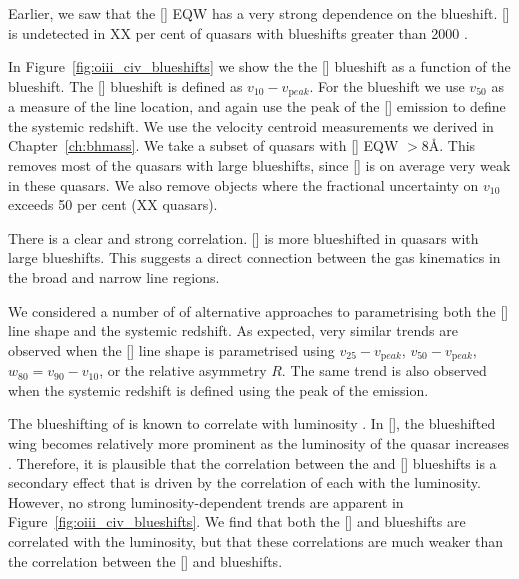 Earlier, we saw that the [] EQW has a very strong dependence on the  blueshift. 
[] is undetected in XX per cent of quasars with  blueshifts greater than 2000 \kms. 

In Figure~\ref{fig:oiii_civ_blueshifts} we show the the [] blueshift as a function of the  blueshift.
The [] blueshift is defined as $v_{10} - v_{\mathrm peak}$.
For the  blueshift we use $v_{50}$ as a measure of the line location, and again use the peak of the [] emission to define the systemic redshift. 
We use the  velocity centroid measurements we derived in Chapter~\ref{ch:bhmass}.
We take a subset of quasars with [] EQW $>8$\AA. 
This removes most of the quasars with large  blueshifts, since [] is on average very weak in these quasars. 
We also remove objects where the fractional uncertainty on $v_{10}$ exceeds 50 per cent (XX quasars). 

There is a clear and strong correlation.
[] is more blueshifted in quasars with large  blueshifts. 
This suggests a direct connection between the gas kinematics in the broad and narrow line regions. 

We considered a number of of alternative approaches to parametrising both the [] line shape and the systemic redshift. 
As expected, very similar trends are observed when the [] line shape is parametrised using $v_{25} - v_{\mathrm peak}$, $v_{50} - v_{\mathrm peak}$, $w_{80} = v_{90} - v_{10}$, or the relative asymmetry $R$.
The same trend is also observed when the systemic redshift is defined using the peak of the \hb emission. 

The blueshifting of  is known to correlate with luminosity \citep{richards11}.
In [], the blueshifted wing becomes relatively more prominent as the luminosity of the quasar increases \citep{shen14}. 
Therefore, it is plausible that the correlation between the  and [] blueshifts is a secondary effect that is driven by the correlation of each with the luminosity. 
However, no strong luminosity-dependent trends are apparent in Figure~\ref{fig:oiii_civ_blueshifts}. 
We find that both the [] and  blueshifts are correlated with the luminosity, but that these correlations are much weaker than the correlation between the [] and  blueshifts. 

